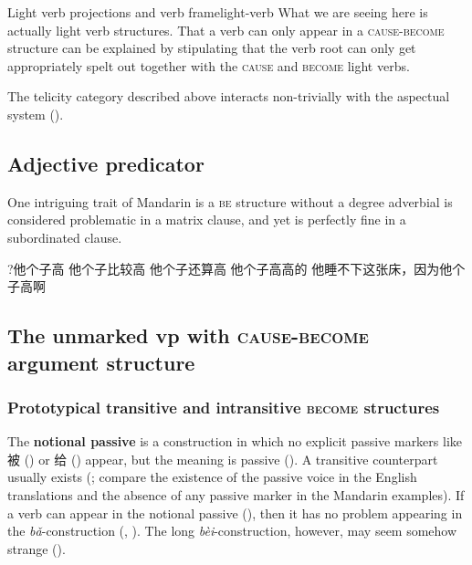 \documentclass[UTF8, a4paper, oneside, scheme=plain]{ctexrep}
\newcommand*{\concept}[1]{\textbf{#1}}
\newcommand{\corpus}[1]{\emph{#1}}
\newcommand*{\category}[1]{\textsc{#1}}
\begin{document}
\begin{theorybox}{Light verb projections and verb frame}{light-verb}
    What we are seeing here is actually light verb structures.
    That a verb can only appear in a \category{cause-become} structure 
    can be explained by stipulating that 
    the verb root can only get appropriately spelt out
    together with the \category{cause} and \category{become} light verbs. 
\end{theorybox}

The telicity category described above interacts non-trivially with 
the aspectual system ().

\subsection{Adjective predicator}

One intriguing trait of Mandarin is a \category{be} structure 
without a degree adverbial is considered problematic
in a matrix clause,
and yet is perfectly fine in a subordinated clause.

\begin{exe}
    \ex ?他个子高
    \ex 他个子比较高
    \ex 他个子还算高
    \ex 他个子高高的
    \ex 他睡不下这张床，因为他个子高啊
\end{exe}

\subsection{The unmarked \acs{vp} with \category{cause}-\category{become} argument structure}

\subsubsection{Prototypical transitive and intransitive \category{become} structures}
\label{sec:verb-phrase.cause-become.ordinary}

The \concept{notional passive} is a construction 
in which no explicit passive markers like 被 
()
or 给 () appear, 
but the meaning is passive
().
A transitive counterpart usually exists 
(; 
compare the existence of the passive voice in the English translations
and the absence of any passive marker in the Mandarin examples).
If a verb can appear in the notional passive
(), 
then it has no problem appearing in the \corpus{bǎ}-construction
(, ).
The long \corpus{bèi}-construction, however, 
may seem somehow strange
().
\end{document}
